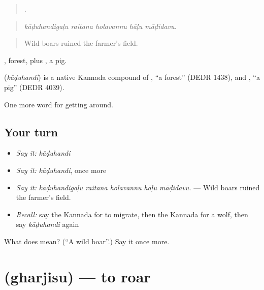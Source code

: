 \begin{quote}
    .
\end{quote}

\begin{quote}
\emph{kāḍuhandigaḷu raitana holavannu hāḷu māḍidavu.}
\end{quote}

\begin{quote}
Wild boars ruined the farmer's field.
\end{quote}

, forest, plus , a pig.

\begin{cousinweb}
\textbf{} (\emph{kāḍuhandi}) is a native Kannada compound of , \textquotedblleft{}a forest\textquotedblright{} (DEDR 1438), and , \textquotedblleft{}a pig\textquotedblright{} (DEDR 4039).
\end{cousinweb}

\begin{grammarlens}[title={What you've built}]
One more word for getting around.
\end{grammarlens}

\subsection*{Your turn}
\begin{itemize}
\raggedright
  \item \emph{Say it:} \emph{kāḍuhandi}
  \item \emph{Say it:} \emph{kāḍuhandi}, once more
  \item \emph{Say it:} \emph{kāḍuhandigaḷu raitana holavannu hāḷu māḍidavu.} — Wild boars ruined the farmer's field.
  \item \emph{Recall:} say the Kannada for to migrate, then the Kannada for a wolf, then say \emph{kāḍuhandi} again
\end{itemize}

\begin{tcolorbox}[breakable,colback=teal!4,colframe=teal!35!black,title={Before you move on}]
What does  mean? (\textquotedblleft{}A wild boar\textquotedblright{}.) Say it once more.
\end{tcolorbox}
\section[\texorpdfstring{\kn{ಘರ್ಜಿಸು} (gharjisu)}{ಘರ್ಜಿಸು (gharjisu)}]{ (gharjisu) — to roar}

